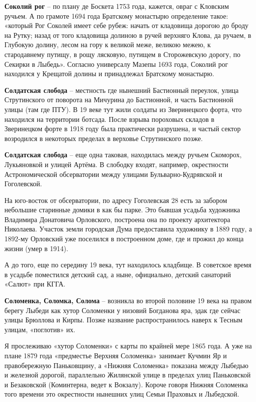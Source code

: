 \textbf{Соколий рог} – по плану де Боскета 1753 года, кажется, овраг с Кловским ручьем. А по грамоте 1694 года Братскому монастырю определение такое: «который Рог Соколей имеет себе рубеж: начать от кладовища дорогою до броду на Рутку; назад от того кладовища долиною в ручей верхняго Клова, да ручаем, в Глубокую долину, лесом на гору к великой меже, великою межею, к стародавнему путищу, в рощу лясковую, путищем в Сторожевскую дорогу, по Секирки в Лыбедь». Согласно универсалу Мазепы 1693 года, Соколий рог находился у Крещатой долины и принадлежал Братскому монастырю.\\

\medskip

\textbf{Солдатская слобода} – местность где нынешний Бастионный переулок, улица Струтинского от поворота на Мичурина до Бастионной, и часть Бастионной улицы (там где ПТУ). В 19 веке тут жили солдаты из Зверинецкого форта, что находился на территории ботсада. После взрыва пороховых складов в Зверинецком форте в 1918 году была практически разрушена, и частый сектор возродился в некоторых пределах в верховье Струтинского позже.\\

\medskip

\textbf{Солдатская слобода} – еще одна таковая, находилась между ручьем Скоморох, Лукьяновкой и улицей Артёма. В слободку входят, например, окрестности Астрономической обсерватории между улицами Бульварно-Кудрявской и Гоголевской.

На юго-восток от обсерватории, по адресу Гоголевская 28 есть за забором небольшие старинные домики в как бы парке. Это бывшая усадьба художника Владимира Донатовича Орловского, построена она по проекту архитектора Николаева. Участок земли городская Дума предоставила художнику в 1889 году, а 1892-му Орловский уже поселился в построенном доме, где и прожил до конца жизни (умер в 1914).

А до того, еще по середину 19 века, тут находилось кладбище. В советское время в усадьбе поместился детский сад, а ныне, официально, детский санаторий «Салют» при КГГА.\\

\medskip

\textbf{Соломенка, Соломка, Солома} – возникла во второй половине 19 века на правом берегу Лыбеди как хутор Соломенки у низовий Богданова яра, эдак где сейчас улицы Брюллова и Кирпы. Позже название распространилось наверх к Тесным улицам, «поглотив» их. 

Я прослеживаю «хутор Соломенки» с карты по крайней мере 1865 года. А уже на плане 1879 года «предместье Верхняя Соломенка» занимает Кучмин Яр и правобережную Паньковщину, а «Нижняя Соломенка» показана между Лыбедью и железной дорогой, параллельно Жилянской улице в пределах улиц Паньковской и Безаковской (Коминтерна, ведет к Вокзалу). Короче говоря Нижняя Соломенка того времени это окрестности нынешних улиц Семьи Праховых и Лыбедской.

